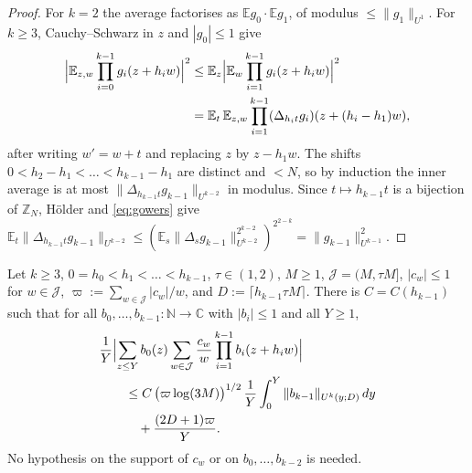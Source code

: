 \begin{proof}
For $k=2$ the average factorises as $\mathbb E g_0\cdot\mathbb Eg_1$, of modulus $\le\|g_1\|_{U^1}$. For $k\ge3$, Cauchy--Schwarz in $z$ and $|g_0|\le1$ give
\begin{equation}
\begin{aligned}
\Bigl|\mathbb E_{z,w}\prod_{i=0}^{k-1}g_i(z+h_iw)\Bigr|^2&\le\mathbb E_{z}\Bigl|\mathbb E_w\prod_{i=1}^{k-1}g_i(z+h_iw)\Bigr|^2\\
&=\mathbb E_t\,\mathbb E_{z,w}\prod_{i=1}^{k-1}(\Delta_{h_it}g_i)(z+(h_i-h_1)w),
\end{aligned}
\label{eq:vn_step}
\end{equation}
after writing $w'=w+t$ and replacing $z$ by $z-h_1w$. The shifts $0<h_2-h_1<\dots<h_{k-1}-h_1$ are distinct and $<N$, so by induction the inner average is at most $\|\Delta_{h_{k-1}t}g_{k-1}\|_{U^{k-2}}$ in modulus. Since $t\mapsto h_{k-1}t$ is a bijection of $\mathbb Z_N$, Hölder and \eqref{eq:gowers} give $\mathbb E_t\|\Delta_{h_{k-1}t}g_{k-1}\|_{U^{k-2}}\le(\mathbb E_s\|\Delta_sg_{k-1}\|_{U^{k-2}}^{2^{k-2}})^{2^{2-k}}=\|g_{k-1}\|_{U^{k-1}}^2$.
\end{proof}

\begin{proposition}
\label{prop:local_control}
Let $k\ge3$, $0=h_0<h_1<\dots<h_{k-1}$, $\tau\in(1,2)$, $M\ge1$, $\mathcal J=(M,\tau M]$, $|c_w|\le1$ for $w\in\mathcal J$, $\varpi:=\sum_{w\in\mathcal J}|c_w|/w$, and $D:=\lceil h_{k-1}\tau M\rceil$. There is $C=C(h_{k-1})$ such that for all $b_0,\dots,b_{k-1}:\mathbb N\to\mathbb C$ with $|b_i|\le1$ and all $Y\ge1$,
\begin{equation}
\begin{aligned}
&\frac1Y\Bigl|\sum_{z\le Y}b_0(z)\sum_{w\in\mathcal J}\frac{c_w}w\prod_{i=1}^{k-1}b_i(z+h_iw)\Bigr|\\
&\qquad\le C\,\bigl(\varpi\log(3M)\bigr)^{1/2}\,\frac1Y\int_0^Y\|b_{k-1}\|_{U^k(y;D)}\,dy\\
&\qquad\quad+\frac{(2D+1)\varpi}{Y}.
\end{aligned}
\label{eq:local_control}
\end{equation}
No hypothesis on the support of $c_w$ or on $b_0,\dots,b_{k-2}$ is needed.
\end{proposition}

